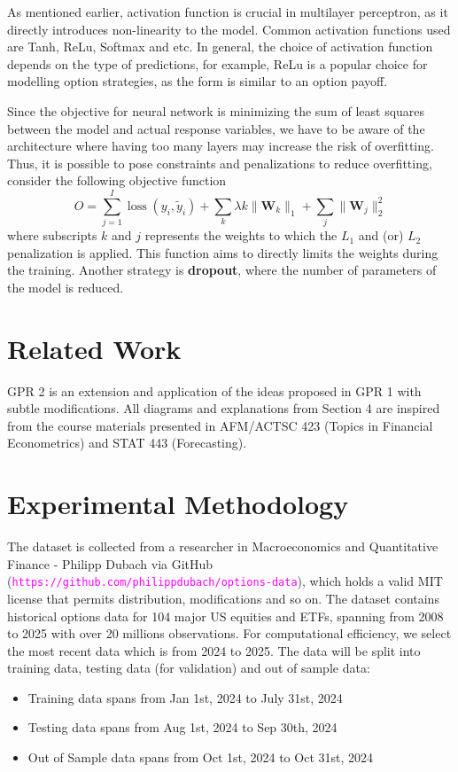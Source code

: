 \documentclass[oneside, 12pt]{article}
\newcommand*{\1}{\text{\scalebox{1.1}{\usefont{U}{bbold}{m}{n}1}}}
\begin{document}
As mentioned earlier, activation function is crucial in multilayer perceptron, as it directly introduces non-linearity to the model. Common activation functions used are Tanh, ReLu, Softmax and etc. In general, the choice of activation function depends on the type of predictions, for example, ReLu is a popular choice for modelling option strategies, as the form is similar to an option payoff. \newline

Since the objective for neural network is minimizing the sum of least squares between the model and actual response variables, we have to be aware of the architecture where having too many layers may increase the risk of overfitting. Thus, it is possible to pose constraints and penalizations to reduce overfitting, consider the following objective function 
$$
O = \sum_{j = 1}^I \operatorname{loss}(y_i, \tilde{y}_i) + \sum_k \lambda k \lVert \boldsymbol W_k \rVert_1 + \sum_j \lVert \boldsymbol W_j \rVert_2^2
$$
where subscripts $k$ and $j$ represents the weights to which the $L_1$ and (or) $L_2$ penalization is applied. This function aims to directly limits the weights during the training. Another strategy is \textbf{dropout}, where the number of parameters of the model is reduced. 

\section{Related Work}
GPR 2 is an extension and application of the ideas proposed in GPR 1 with subtle modifications. All diagrams and explanations from Section 4 are inspired from the course materials presented in AFM/ACTSC 423 (Topics in Financial Econometrics) and STAT 443 (Forecasting). 

\newpage

\section{Experimental Methodology}
The dataset is collected from a researcher in Macroeconomics and Quantitative Finance - Philipp Dubach via GitHub (\textcolor{magenta}{\texttt{https://github.com/philippdubach/options-data}}), which holds a valid MIT license that permits distribution, modifications and so on. The dataset contains historical options data for 104 major US equities and ETFs, spanning from 2008 to 2025 with over 20 millions observations. For computational efficiency, we select the most recent data which is from 2024 to 2025. The data will be split into training data, testing data (for validation) and out of sample data:
\begin{itemize}
\item Training data spans from Jan 1st, 2024 to July 31st, 2024
\item Testing data spans from Aug 1st, 2024 to Sep 30th, 2024
\item Out of Sample data spans from Oct 1st, 2024 to Oct 31st, 2024
\end{itemize}
\end{document}
